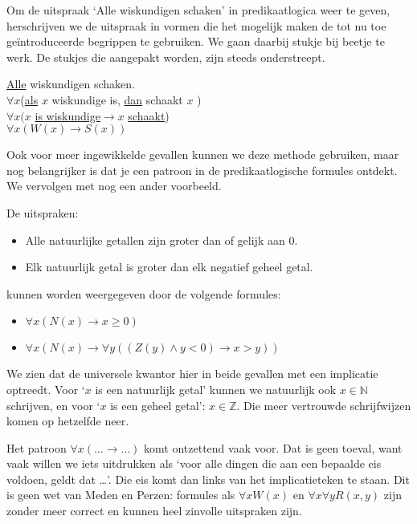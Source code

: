 \begin{example}
Om de uitspraak `Alle wiskundigen schaken' in predikaatlogica weer te geven, herschrijven we de uitspraak in vormen die het mogelijk maken de tot nu toe ge\"introduceerde begrippen te gebruiken. We gaan daarbij stukje bij beetje te werk. De stukjes die aangepakt worden, zijn steeds onderstreept.

\noindent
\underline{Alle} wiskundigen schaken.\\
$\forall x$(\underline{als} $x$ wiskundige is, \underline{dan} schaakt $x$ )\\
$\forall x (x$ \underline{is wiskundige}$\rightarrow x$ \underline{schaakt})\\
$\forall x(W(x)\rightarrow S(x))$
\end{example}

Ook voor meer ingewikkelde gevallen kunnen we deze methode gebruiken, maar nog belangrijker is dat je een patroon in de predikaatlogische formules ontdekt. We vervolgen met nog een ander voorbeeld.
\begin{example}
De uitspraken:
\begin{itemize}
    \item Alle natuurlijke getallen zijn groter dan of gelijk aan 0.
    \item Elk natuurlijk getal is groter dan elk negatief geheel getal.
\end{itemize}
kunnen worden weergegeven door de volgende formules:
\begin{itemize}
    \item $\forall x(N(x)\rightarrow x\geq 0)$
    \item $\forall x(N(x)\rightarrow\forall y((Z(y)\wedge y< 0)\rightarrow x> y))$
\end{itemize}
We zien dat de universele kwantor hier in beide gevallen met een implicatie optreedt. Voor `$x$ is een natuurlijk getal' kunnen we natuurlijk ook $x\in\mathbb{N}$ schrijven, en voor `$x$ is een geheel getal': $x\in\mathbb{Z}$. Die meer vertrouwde schrijfwijzen komen op hetzelfde neer.
\end{example}

Het patroon $\forall x(\ldots\rightarrow\ldots)$ komt ontzettend vaak voor. Dat is geen toeval, want vaak willen we iets uitdrukken als `voor alle dingen die aan een bepaalde eis voldoen, geldt dat \ldots'. Die eis komt dan links van het implicatieteken te staan. Dit is geen wet van Meden en Perzen: formules als $\forall x W(x)$ en $\forall x\forall y R(x,y)$ zijn zonder meer correct en kunnen heel zinvolle uitspraken zijn.


